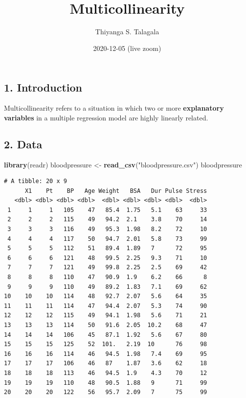 \documentclass[]{article}
\title{Multicollinearity}
\author{Thiyanga S. Talagala}
\date{2020-12-05 (live zoom)}
\newenvironment{Shaded}{\begin{snugshade}}{\end{snugshade}}
\newcommand{\KeywordTok}[1]{\textcolor[rgb]{0.13,0.29,0.53}{\textbf{#1}}}
\newcommand{\NormalTok}[1]{#1}
\newcommand{\StringTok}[1]{\textcolor[rgb]{0.31,0.60,0.02}{#1}}
\begin{document}
\maketitle

\hypertarget{introduction}{%
\subsection{1. Introduction}\label{introduction}}

Multicollinearity refers to a situation in which two or more
\textbf{explanatory variables} in a multiple regression model are highly
linearly related.

\hypertarget{data}{%
\subsection{2. Data}\label{data}}

\begin{Shaded}
\begin{Highlighting}[]
\KeywordTok{library}\NormalTok{(readr)}
\NormalTok{bloodpressure <-}\StringTok{ }\KeywordTok{read_csv}\NormalTok{(}\StringTok{"bloodpressure.csv"}\NormalTok{)}
\NormalTok{bloodpressure}
\end{Highlighting}
\end{Shaded}

\begin{verbatim}
# A tibble: 20 x 9
      X1    Pt    BP   Age Weight   BSA   Dur Pulse Stress
   <dbl> <dbl> <dbl> <dbl>  <dbl> <dbl> <dbl> <dbl>  <dbl>
 1     1     1   105    47   85.4  1.75   5.1    63     33
 2     2     2   115    49   94.2  2.1    3.8    70     14
 3     3     3   116    49   95.3  1.98   8.2    72     10
 4     4     4   117    50   94.7  2.01   5.8    73     99
 5     5     5   112    51   89.4  1.89   7      72     95
 6     6     6   121    48   99.5  2.25   9.3    71     10
 7     7     7   121    49   99.8  2.25   2.5    69     42
 8     8     8   110    47   90.9  1.9    6.2    66      8
 9     9     9   110    49   89.2  1.83   7.1    69     62
10    10    10   114    48   92.7  2.07   5.6    64     35
11    11    11   114    47   94.4  2.07   5.3    74     90
12    12    12   115    49   94.1  1.98   5.6    71     21
13    13    13   114    50   91.6  2.05  10.2    68     47
14    14    14   106    45   87.1  1.92   5.6    67     80
15    15    15   125    52  101.   2.19  10      76     98
16    16    16   114    46   94.5  1.98   7.4    69     95
17    17    17   106    46   87    1.87   3.6    62     18
18    18    18   113    46   94.5  1.9    4.3    70     12
19    19    19   110    48   90.5  1.88   9      71     99
20    20    20   122    56   95.7  2.09   7      75     99
\end{verbatim}
\end{document}
